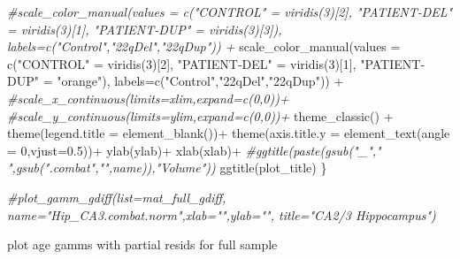 \documentclass[
]{article}
\newenvironment{Shaded}{\begin{snugshade}}{\end{snugshade}}
\newcommand{\AttributeTok}[1]{\textcolor[rgb]{0.77,0.63,0.00}{#1}}
\newcommand{\CommentTok}[1]{\textcolor[rgb]{0.56,0.35,0.01}{\textit{#1}}}
\newcommand{\DecValTok}[1]{\textcolor[rgb]{0.00,0.00,0.81}{#1}}
\newcommand{\FloatTok}[1]{\textcolor[rgb]{0.00,0.00,0.81}{#1}}
\newcommand{\FunctionTok}[1]{\textcolor[rgb]{0.00,0.00,0.00}{#1}}
\newcommand{\NormalTok}[1]{#1}
\newcommand{\OtherTok}[1]{\textcolor[rgb]{0.56,0.35,0.01}{#1}}
\newcommand{\SpecialCharTok}[1]{\textcolor[rgb]{0.00,0.00,0.00}{#1}}
\newcommand{\StringTok}[1]{\textcolor[rgb]{0.31,0.60,0.02}{#1}}
\begin{document}
\begin{Shaded}
\begin{Highlighting}[]
    \CommentTok{\#scale\_color\_manual(values = c("CONTROL" = viridis(3)[2], "PATIENT{-}DEL" = viridis(3)[1], "PATIENT{-}DUP" = viridis(3)[3]), labels=c("Control","22qDel","22qDup")) +}
    \FunctionTok{scale\_color\_manual}\NormalTok{(}\AttributeTok{values =} \FunctionTok{c}\NormalTok{(}\StringTok{"CONTROL"} \OtherTok{=} \FunctionTok{viridis}\NormalTok{(}\DecValTok{3}\NormalTok{)[}\DecValTok{2}\NormalTok{], }\StringTok{"PATIENT{-}DEL"} \OtherTok{=} \FunctionTok{viridis}\NormalTok{(}\DecValTok{3}\NormalTok{)[}\DecValTok{1}\NormalTok{], }\StringTok{"PATIENT{-}DUP"} \OtherTok{=} \StringTok{"orange"}\NormalTok{), }\AttributeTok{labels=}\FunctionTok{c}\NormalTok{(}\StringTok{"Control"}\NormalTok{,}\StringTok{"22qDel"}\NormalTok{,}\StringTok{"22qDup"}\NormalTok{)) }\SpecialCharTok{+}
    \CommentTok{\#scale\_x\_continuous(limits=xlim,expand=c(0,0))+}
    \CommentTok{\#scale\_y\_continuous(limits=ylim,expand=c(0,0))+}
    \FunctionTok{theme\_classic}\NormalTok{() }\SpecialCharTok{+} 
    \FunctionTok{theme}\NormalTok{(}\AttributeTok{legend.title =} \FunctionTok{element\_blank}\NormalTok{())}\SpecialCharTok{+}
    \FunctionTok{theme}\NormalTok{(}\AttributeTok{axis.title.y =} \FunctionTok{element\_text}\NormalTok{(}\AttributeTok{angle =} \DecValTok{0}\NormalTok{,}\AttributeTok{vjust=}\FloatTok{0.5}\NormalTok{))}\SpecialCharTok{+}
    \FunctionTok{ylab}\NormalTok{(ylab)}\SpecialCharTok{+}
    \FunctionTok{xlab}\NormalTok{(xlab)}\SpecialCharTok{+}
    \CommentTok{\#ggtitle(paste(gsub("\_"," ",gsub(".combat","",name)),"Volume"))}
    \FunctionTok{ggtitle}\NormalTok{(plot\_title)}
\NormalTok{\}}

\CommentTok{\#plot\_gamm\_gdiff(list=mat\_full\_gdiff, name="Hip\_CA3.combat.norm",xlab="",ylab="", title="CA2/3 Hippocampus")}
\end{Highlighting}
\end{Shaded}

plot age gamms with partial resids for full sample
\end{document}
